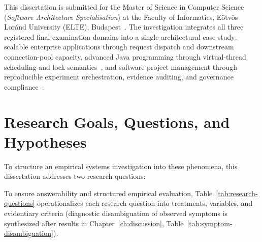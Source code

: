 This dissertation is submitted for the Master of Science in Computer Science (\emph{Software Architecture Specialisation}) at the Faculty of Informatics, Eötvös Loránd University (ELTE), Budapest~\cite{elteikMscRules,morseMscGuidance}. The investigation integrates all three registered final-examination domains into a single architectural case study: scalable enterprise applications through request dispatch and downstream connection-pool capacity, advanced Java programming through virtual-thread scheduling and lock semantics~\cite{JEP444,JEP491}, and software project management through reproducible experiment orchestration, evidence auditing, and governance compliance~\cite{elteikAiPolicy}.

\section{Research Goals, Questions, and Hypotheses}
\label{sec:research-questions}

To structure an empirical systems investigation into these phenomena, this dissertation addresses two research questions:

\bigskip

\noindent{}

\bigskip

\noindent{}

\bigskip

To ensure answerability and structured empirical evaluation, Table~\ref{tab:research-questions} operationalizes each research question into treatments, variables, and evidentiary criteria (diagnostic disambiguation of observed symptoms is synthesized after results in Chapter~\ref{ch:discussion}, Table~\ref{tab:symptom-disambiguation}).

